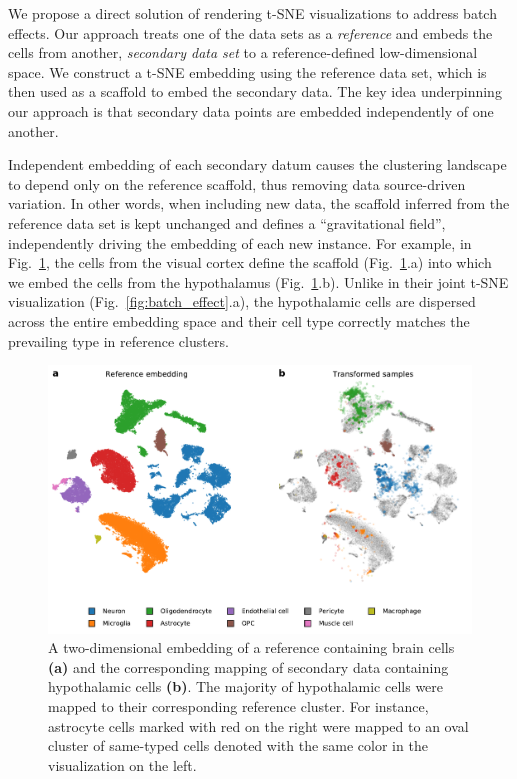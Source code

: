 \documentclass[runningheads]{llncs}
\begin{document}
We propose a direct solution of rendering t-SNE visualizations to address
batch effects. Our approach treats one of the data sets as a {\em reference}
and embeds the cells from another, {\em secondary data set} to a reference-defined
low-dimensional space.  We construct a t\nobreakdash -SNE embedding using the
reference data set, which is then used as a scaffold to embed the
secondary data. The key idea underpinning our approach is that secondary data
points are embedded independently of one another.

Independent embedding of each secondary datum causes the clustering landscape
to depend only on the reference scaffold, thus removing data source-driven
variation. In other words, when including new data, the scaffold inferred from
the reference data set is kept unchanged and defines a ``gravitational field'',
independently driving the embedding of each new instance. For example, in
Fig.~\ref{fig:transform_brain}, the cells from the visual cortex define the
scaffold (Fig.~\ref{fig:transform_brain}.a) into which we embed the cells from
the hypothalamus (Fig.~\ref{fig:transform_brain}.b). Unlike in their joint
t\nobreakdash -SNE visualization (Fig.~\ref{fig:batch_effect}.a), the
hypothalamic cells are dispersed across the entire embedding space and their
cell type correctly matches the prevailing type in reference clusters.

\begin{figure}[htb]
  \includegraphics[width=\textwidth]{transform_brain.pdf}
  \caption{A two-dimensional embedding of a reference containing brain cells
  \textbf{(a)} and the corresponding mapping of secondary data containing hypothalamic
  cells \textbf{(b)}.  The majority of hypothalamic cells were mapped to their
  corresponding reference cluster. For instance, astrocyte cells marked with
  red on the right were mapped to an oval cluster of same-typed cells denoted
  with the same color in the visualization on the left.}
  \label{fig:transform_brain}
\end{figure}
\end{document}
